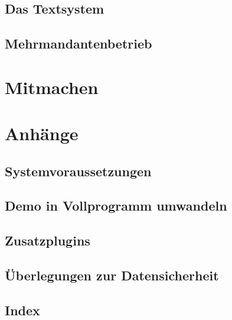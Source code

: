 \documentclass[a4paper,BCOR8.25mm,twoside]{scrbook}
\begin{document}
\chapter{Das Textsystem}
	
	
	


\chapter{Mehrmandantenbetrieb}
	
	
\part{Mitmachen}


\part{Anhänge}
\appendix

\chapter{Systemvoraussetzungen}
	
\chapter{Demo in Vollprogramm umwandeln}
	



\chapter{Zusatzplugins}
    
\chapter{Überlegungen zur Datensicherheit}	
	

\chapter{Index}
\printindex
\end{document}
